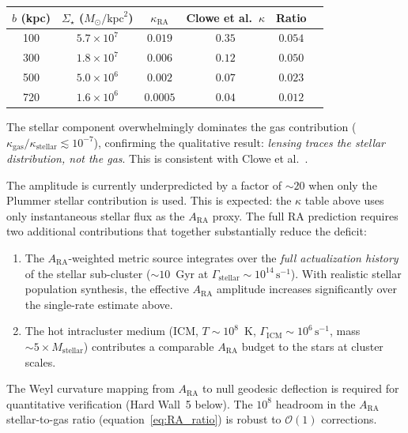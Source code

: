 \documentclass[11pt,a4paper]{article}
\theoremstyle{plain}
\theoremstyle{definition}
\theoremstyle{remark}
\begin{document}
\begin{center}
\renewcommand{\arraystretch}{1.20}
\begin{tabular}{cccccc}
\toprule
$b$ (kpc) & $\Sigma_\star$ ($M_\odot/\mathrm{kpc}^2$)
          & $\kappa_{\mathrm{RA}}$ & Clowe et al.\ $\kappa$ & Ratio \\
\midrule
100 & $5.7\times10^7$ & $0.019$ & $0.35$ & $0.054$ \\
300 & $1.8\times10^7$ & $0.006$ & $0.12$ & $0.050$ \\
500 & $5.0\times10^6$ & $0.002$ & $0.07$ & $0.023$ \\
720 & $1.6\times10^6$ & $0.0005$ & $0.04$ & $0.012$ \\
\bottomrule
\end{tabular}
\end{center}

\noindent
The stellar component overwhelmingly dominates the gas contribution
($\kappa_{\mathrm{gas}} / \kappa_{\mathrm{stellar}} \lesssim 10^{-7}$),
confirming the qualitative result: \emph{lensing traces the stellar
distribution, not the gas}. This is consistent with Clowe et al.~\citep{Clowe2006}.

The amplitude is currently underpredicted by a factor of $\sim 20$ when
only the Plummer stellar contribution is used. This is expected: the $\kappa$
table above uses only instantaneous stellar flux as the $A_{\mathrm{RA}}$ proxy.
The full RA prediction requires two additional contributions that together
substantially reduce the deficit:
\begin{enumerate}[noitemsep]
  \item The $A_{\mathrm{RA}}$-weighted metric source integrates over the
        \emph{full actualization history} of the stellar sub-cluster
        ($\sim 10$~Gyr at $\Gamma_{\mathrm{stellar}} \sim 10^{14}\,\mathrm{s}^{-1}$).
        With realistic stellar population synthesis, the effective $A_{\mathrm{RA}}$
        amplitude increases significantly over the single-rate estimate above.
  \item The hot intracluster medium (ICM, $T \sim 10^8$~K,
        $\Gamma_{\mathrm{ICM}} \sim 10^6\,\mathrm{s}^{-1}$,
        mass $\sim 5\times M_{\mathrm{stellar}}$) contributes a comparable
        $A_{\mathrm{RA}}$ budget to the stars at cluster scales.
\end{enumerate}
The Weyl curvature mapping from $A_{\mathrm{RA}}$ to null geodesic deflection
is required for quantitative verification (Hard Wall~5 below). The
$10^8$ headroom in the $A_{\mathrm{RA}}$ stellar-to-gas ratio
(equation~\eqref{eq:RA_ratio}) is robust to $\mathcal{O}(1)$ corrections.
\end{document}
